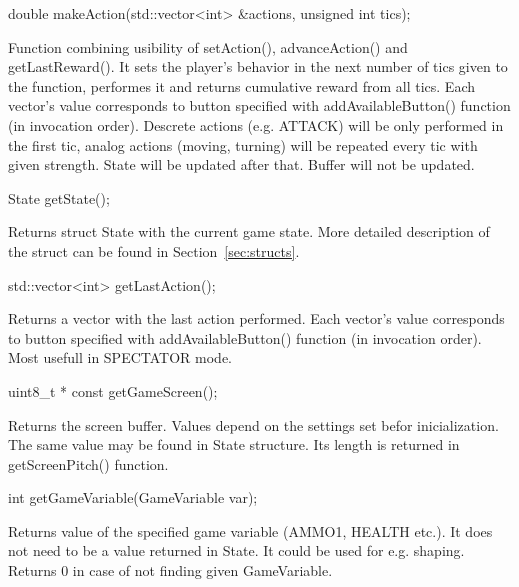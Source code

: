 \vspace{20pt}
\begin{clinee}
	double makeAction(std::vector<int> &actions, unsigned int tics);
\end{clinee}

Function combining usibility of setAction(), advanceAction() and getLastReward(). It sets the player's behavior in the next number of tics given to the function, performes it and returns cumulative reward from all tics. Each vector's value corresponds to button specified with addAvailableButton() function (in invocation order). Descrete actions (e.g. ATTACK) will be only performed in the first tic, analog actions (moving, turning) will be repeated every tic with given strength.
State will be updated after that. Buffer will not be updated.


\vspace{20pt}
\begin{clinee}
	State getState();
\end{clinee}

Returns struct State with the current game state. More detailed description of the struct can be found in Section~\ref{sec:structs}.


\vspace{20pt}
\begin{clinee}
	std::vector<int> getLastAction();
\end{clinee}

Returns a vector with the last action performed. Each vector's value corresponds to button specified with addAvailableButton() function (in invocation order). Most usefull in SPECTATOR mode.


\vspace{20pt}
\begin{clinee}
	uint8_t * const getGameScreen();
\end{clinee}

Returns the screen buffer. Values depend on the settings set befor inicialization. The same value may be found in State structure. Its length is returned in getScreenPitch() function.


\vspace{20pt}
\begin{clinee}
	int getGameVariable(GameVariable var);
\end{clinee}

Returns value of the specified game variable (AMMO1, HEALTH etc.). It does not need to be a value returned in State.
It could be used for e.g. shaping. Returns 0 in case of not finding given GameVariable.


